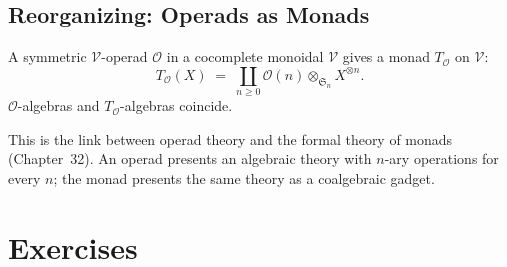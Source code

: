 \subsection{Reorganizing: Operads as Monads}

\begin{proposition}
\label{prop:operad-monad}
A symmetric $\mathcal{V}$-operad $\mathcal{O}$ in a cocomplete monoidal
$\mathcal{V}$ gives a monad $T_\mathcal{O}$ on $\mathcal{V}$:
\begin{equation*}
  T_\mathcal{O}(X) \;=\; \coprod_{n \geq 0} \mathcal{O}(n) \otimes_{\mathfrak{S}_n}
  X^{\otimes n}.
\end{equation*}
$\mathcal{O}$-algebras and $T_\mathcal{O}$-algebras coincide.
\end{proposition}

\begin{remark}
This is the link between operad theory and the formal theory of monads
(Chapter~32). An operad presents an algebraic theory with $n$-ary operations
for every $n$; the monad presents the same theory as a coalgebraic gadget.
\end{remark}


\section{Exercises}
\label{sec:mon-coherence-exercises}

